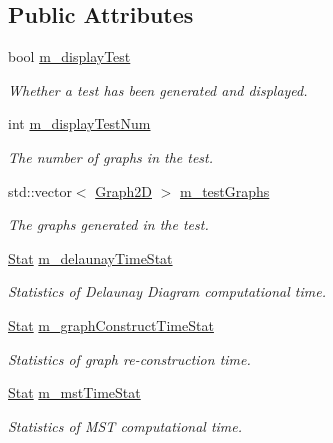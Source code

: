 \subsection*{Public Attributes}
\begin{DoxyCompactItemize}
\item 
bool \hyperlink{structcmst_1_1_window_1_1_test_a6e01140b018e7c479b15ae6499d8b9e8}{m\_displayTest}
\begin{DoxyCompactList}\small\item\em Whether a test has been generated and displayed. \end{DoxyCompactList}\item 
int \hyperlink{structcmst_1_1_window_1_1_test_a0968826c727c33df28c160c4095e0b2f}{m\_displayTestNum}
\begin{DoxyCompactList}\small\item\em The number of graphs in the test. \end{DoxyCompactList}\item 
std::vector$<$ \hyperlink{classcmst_1_1_graph2_d}{Graph2D} $>$ \hyperlink{structcmst_1_1_window_1_1_test_a42f44814c524399a3c1f547a64218c1a}{m\_testGraphs}
\begin{DoxyCompactList}\small\item\em The graphs generated in the test. \end{DoxyCompactList}\item 
\hyperlink{classcmst_1_1_stat}{Stat} \hyperlink{structcmst_1_1_window_1_1_test_a6f0ad01079d1c5b149282e31db771772}{m\_delaunayTimeStat}
\begin{DoxyCompactList}\small\item\em Statistics of Delaunay Diagram computational time. \end{DoxyCompactList}\item 
\hyperlink{classcmst_1_1_stat}{Stat} \hyperlink{structcmst_1_1_window_1_1_test_a4ff72191889ff43d7d80517120a97fae}{m\_graphConstructTimeStat}
\begin{DoxyCompactList}\small\item\em Statistics of graph re-\/construction time. \end{DoxyCompactList}\item 
\hyperlink{classcmst_1_1_stat}{Stat} \hyperlink{structcmst_1_1_window_1_1_test_a103594f227a761c33c06b8dd68713c18}{m\_mstTimeStat}
\begin{DoxyCompactList}\small\item\em Statistics of MST computational time. \end{DoxyCompactList}\end{DoxyCompactItemize}


